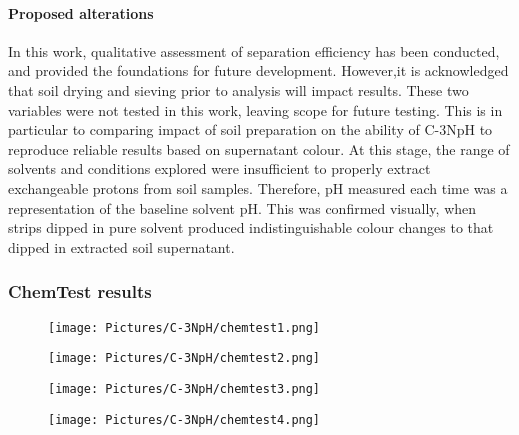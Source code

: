 \paragraph{Proposed alterations} \label{appen:alter}

In this work, qualitative assessment of separation efficiency has been conducted, and provided the foundations for future development. However,it is acknowledged that soil drying and sieving prior to analysis will impact results. These two variables were not tested in this work, leaving scope for future testing. This is in particular to comparing impact of soil preparation on the ability of C-3NpH to reproduce reliable results based on supernatant colour. At this stage, the range of solvents and conditions explored were insufficient to properly extract exchangeable protons from soil samples. Therefore, pH measured each time was a representation of the baseline solvent pH. This was confirmed visually, when strips dipped in pure solvent produced indistinguishable colour changes to that dipped in extracted soil supernatant. 


\newpage
\subsubsection{ChemTest results} \label{Chemtest}
\begin{figure}[h!]
	\centering
	\texttt{[image: Pictures/C-3NpH/chemtest1.png]}
	\end{figure}
	\begin{figure}[h!]
	\centering
	\texttt{[image: Pictures/C-3NpH/chemtest2.png]}
	\end{figure}
	\begin{figure}[h!]
	\centering
	\texttt{[image: Pictures/C-3NpH/chemtest3.png]}
	\end{figure}
	\begin{figure}[h!]
	\centering
	\texttt{[image: Pictures/C-3NpH/chemtest4.png]}
	\end{figure}   
	
	
	
	\clearpage